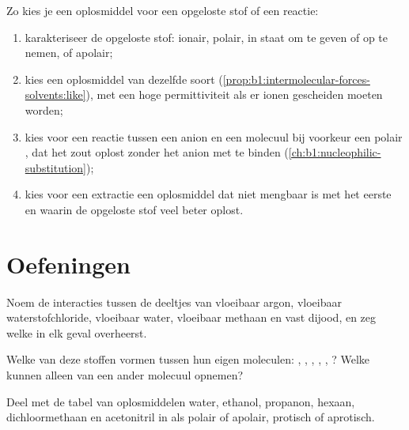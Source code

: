 \begin{method}\label{met:b1:intermolecular-forces-solvents:choose}
Zo kies je een oplosmiddel voor een opgeloste stof of een reactie:
\begin{enumerate}
  \item karakteriseer de opgeloste stof: ionair, polair, in staat om
         te geven of op te nemen, of apolair;
  \item kies een oplosmiddel van dezelfde soort (\cref{prop:b1:intermolecular-forces-solvents:like}),
        met een hoge permittiviteit als er ionen gescheiden moeten worden;
  \item kies voor een reactie tussen een anion en een molecuul bij
        voorkeur een polair , dat het zout oplost
        zonder het anion met  te binden
        (\cref{ch:b1:nucleophilic-substitution});
  \item kies voor een extractie een oplosmiddel dat niet mengbaar is met
        het eerste en waarin de opgeloste stof veel beter oplost.
\end{enumerate}
\end{method}

\section{Oefeningen}

\begin{exercise}[$\star$]\label{exo:b1:intermolecular-forces-solvents:1}
Noem de interacties tussen de deeltjes van vloeibaar argon, vloeibaar
waterstofchloride, vloeibaar water, vloeibaar methaan en vast dijood, en
zeg welke in elk geval overheerst.
\end{exercise}

\begin{exercise}[$\star$]\label{exo:b1:intermolecular-forces-solvents:2}
Welke van deze stoffen vormen  tussen hun eigen
moleculen: , , , , ,
? Welke kunnen alleen  van een ander molecuul
opnemen?
\end{exercise}

\begin{exercise}[$\star$]\label{exo:b1:intermolecular-forces-solvents:3}
Deel met de tabel van oplosmiddelen water, ethanol, propanon, hexaan,
dichloormethaan en acetonitril in als polair of apolair, protisch of
aprotisch.
\end{exercise}

